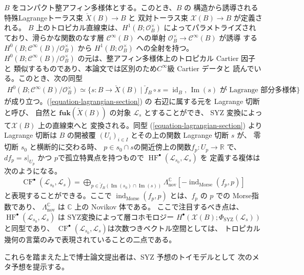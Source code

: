\documentclass[uplatex,dvipdfmx,12pt]{jsarticle}
\numberwithin{equation}{section}
\theoremstyle{definition}
\newcommand{\opn}[1]{\operatorname{#1}}
\newcommand{\catn}[1]{\mathbf{#1}}
\begin{document}
$B$ をコンパクト整アフィン多様体とする。このとき、$B$ の
構造から誘導される特殊Lagrangeトーラス束 
$\check{X}(B)\to B$ と 
双対トーラス束 $\mathcal{X}(B)\to B$ が定義される。
$B$ 上のトロピカル直線束は、$H^{1}(B;\mathcal{O}^{\times}_B)$
によってパラメトライズされており、滑らかな関数のなす層 
$\mathcal{C}^{\infty}(B)$ への単射 
$\mathcal{O}_{B}^{\times}\to \mathcal{C}^{\infty}(B)$ が誘導
する $H^{0}(B;\mathcal{C}^{\infty}(B)/\mathcal{O}_{B}^{\times})$
から $H^{1}(B;\mathcal{O}^{\times}_B)$ への全射を持つ。
$H^{0}(B;\mathcal{C}^{\infty}(B)/\mathcal{O}_{B}^{\times})$
の元は、整アフィン多様体上のトロピカル Cartier 因子と
類似するものであり、本論文では区別のため$C^{\infty}$級
Cartier データと
読んでいる。このとき、次の同型
\begin{align} \label{equation-lagrangian-section}
H^{0}(B;\mathcal{C}^{\infty}(B)/\mathcal{O}_{B}^{\times})
\simeq \{s\colon B\to \check{X}(B)\mid 
\check{f}_{B}\circ s=\opn{id}_B, \,
\opn{Im}(s) \text{ が Lagrange 部分多様体} \}
\end{align}
が成り立つ。(\ref{equation-lagrangian-section}) の
右辺に属する元を Lagrange 切断と呼び、
自然と $\catn{fuk}(\check{X}(B))$ の対象
$\mathscr{L}_s$ とすることができ、
SYZ 変換によって$\mathcal{X}(B)$ 上の直線束へと
変換される。同型 (\ref{equation-lagrangian-section})
より Lagrange 切断は $B$ の開被覆 $(U_i)_{i\in I}$ 
とその上の関数
Lagrange 切断 $s$ が、
零切断 $s_0$ と横断的に交わる時、
$p\in s_0\cap s$の開近傍上の関数$f_p\colon U_p\to \mathbb{R}$
で、$df_p=s|_{U_p}$ かつ $p$で孤立特異点を持つもので 
$\opn{HF}^{\bullet}(\mathscr{L}_{s_0},\mathscr{L}_s)$ を
定義する複体は次のようになる。
\begin{align}
\opn{CF}^{\bullet}(\mathscr{L}_{s_0},
\mathscr{L}_s)=\bigoplus_{p\in \check{f}_{B}(\opn{Im}(s_0)\cap \opn{Im}(s))}
\Lambda^{\mathbb{C}}_{\mathrm{nov}}[-\opn{ind}_{\mathrm{Morse}}(f_p,p)]
\end{align}
と表現することができる\cite{MR1882331}。ここで
$\opn{ind}_{\mathrm{Morse}}(f_p,p)$
とは、$f_p$ の $p$ での Morse指数であり、
$\Lambda^{\mathbb{C}}_{\mathrm{nov}}$ は
$\mathbb{C}$ 上の Novikov 体である。
ここで注目するべき点は、
$\opn{HF}^{\bullet}(\mathscr{L}_{s_0},\mathscr{L}_{s})$
は SYZ変換によって層コホモロジー
$H^{\bullet}(\mathcal{X}(B);
\Phi_{\opn{SYZ}}(\mathscr{L}_{s}))$
と同型であり\cite{MR4301560}、
$\opn{CF}^{\bullet}(\mathscr{L}_{s_0},
\mathscr{L}_s)$は次数つきベクトル空間としては、
トロピカル幾何の言葉のみで表現されていることの二点である。

これらを踏まえた上で博士論文提出者は、SYZ 予想のトイモデルとして
次のメタ予想を提示する。
\end{document}
